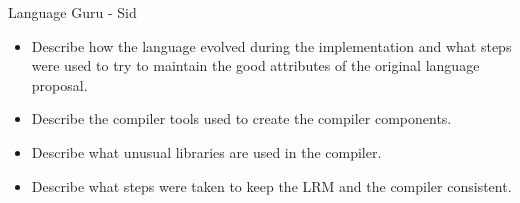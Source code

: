 Language Guru - Sid
\begin{itemize}
\item Describe how the language evolved during the implementation and what steps were used to try to maintain the good attributes of the original language proposal.
\item Describe the compiler tools used to create the compiler components.
\item Describe what unusual libraries are used in the compiler.
\item Describe what steps were taken to keep the LRM and the compiler consistent.
\end{itemize}